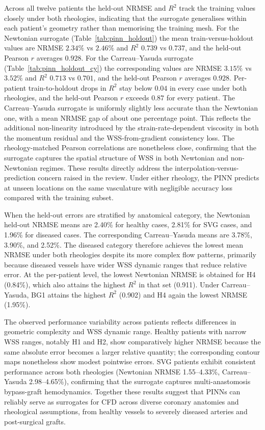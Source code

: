 ﻿\documentclass[12pt,a4paper]{article}
\newcommand{\added}[2][]{\begingroup\color{red}#2\endgroup}
\newcommand{\addp}[1]{\added{#1}}
\theoremstyle{definition}
\numberwithin{equation}{section}
\begin{document}
\addp{Across all twelve patients the held-out NRMSE and $R^2$ track the training values closely under both rheologies, indicating that the surrogate generalises within each patient's geometry rather than memorising the training mesh. For the Newtonian surrogate (Table~\ref{tab:pinn_holdout}) the mean train-versus-holdout values are NRMSE $2.34\%$ vs $2.46\%$ and $R^2$ $0.739$ vs $0.737$, and the held-out Pearson $r$ averages $0.928$. For the Carreau--Yasuda surrogate (Table~\ref{tab:pinn_holdout_cy}) the corresponding values are NRMSE $3.15\%$ vs $3.52\%$ and $R^2$ $0.713$ vs $0.701$, and the held-out Pearson $r$ averages $0.928$. Per-patient train-to-holdout drops in $R^2$ stay below $0.04$ in every case under both rheologies, and the held-out Pearson $r$ exceeds $0.87$ for every patient. The Carreau--Yasuda surrogate is uniformly slightly less accurate than the Newtonian one, with a mean NRMSE gap of about one percentage point. This reflects the additional non-linearity introduced by the strain-rate-dependent viscosity in both the momentum residual and the WSS-from-gradient consistency loss. The rheology-matched Pearson correlations are nonetheless close, confirming that the surrogate captures the spatial structure of WSS in both Newtonian and non-Newtonian regimes. These results directly address the interpolation-versus-prediction concern raised in the review. Under either rheology, the PINN predicts at unseen locations on the same vasculature with negligible accuracy loss compared with the training subset.}

\addp{When the held-out errors are stratified by anatomical category, the Newtonian held-out NRMSE means are 2.40\% for healthy cases, 2.81\% for SVG cases, and 1.96\% for diseased cases. The corresponding Carreau--Yasuda means are 3.78\%, 3.90\%, and 2.52\%. The diseased category therefore achieves the lowest mean NRMSE under both rheologies despite its more complex flow patterns, primarily because diseased vessels have wider WSS dynamic ranges that reduce relative error. At the per-patient level, the lowest Newtonian NRMSE is obtained for H4 (0.84\%), which also attains the highest $R^2$ in that set (0.911). Under Carreau--Yasuda, BG1 attains the highest $R^2$ (0.902) and H4 again the lowest NRMSE (1.95\%).}

\addp{The observed performance variability across patients reflects differences in geometric complexity and WSS dynamic range. Healthy patients with narrow WSS ranges, notably H1 and H2, show comparatively higher NRMSE because the same absolute error becomes a larger relative quantity; the corresponding contour maps nonetheless show modest pointwise errors. SVG patients exhibit consistent performance across both rheologies (Newtonian NRMSE 1.55--4.33\%, Carreau--Yasuda 2.98--4.65\%), confirming that the surrogate captures multi-anastomosis bypass-graft hemodynamics. Together these results suggest that PINNs can reliably serve as surrogates for CFD across diverse coronary anatomies and rheological assumptions, from healthy vessels to severely diseased arteries and post-surgical grafts.}
\end{document}
